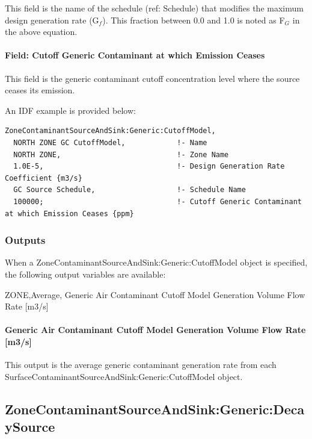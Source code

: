 This field is the name of the schedule (ref: Schedule) that modifies the maximum design generation rate (G\(_{f}\)). This fraction between 0.0 and 1.0 is noted as F\(_{G}\) in the above equation.

\paragraph{Field: Cutoff Generic Contaminant at which Emission Ceases}\label{field-cutoff-generic-contaminant-at-which-emission-ceases}

This field is the generic contaminant cutoff concentration level where the source ceases its emission.

An IDF example is provided below:

\begin{lstlisting}
ZoneContaminantSourceAndSink:Generic:CutoffModel,
  NORTH ZONE GC CutoffModel,            !- Name
  NORTH ZONE,                           !- Zone Name
  1.0E-5,                               !- Design Generation Rate Coefficient {m3/s}
  GC Source Schedule,                   !- Schedule Name
  100000;                               !- Cutoff Generic Contaminant at which Emission Ceases {ppm}
\end{lstlisting}

\subsubsection{Outputs}\label{outputs-9-003}

When a ZoneContaminantSourceAndSink:Generic:CutoffModel object is specified, the following output variables are available:

ZONE,Average, Generic Air Contaminant Cutoff Model Generation Volume Flow Rate {[}m3/s{]}

\paragraph{Generic Air Contaminant Cutoff Model Generation Volume Flow Rate {[}m3/s{]}}\label{generic-air-contaminant-cutoff-model-generation-volume-flow-rate-m3s}

This output is the average generic contaminant generation rate from each Surface\-Contaminant\-Source\-And\-Sink:\-Generic:\-Cutoff\-Model object.

\subsection{ZoneContaminantSourceAndSink:Generic:DecaySource}\label{zonecontaminantsourceandsinkgenericdecaysource}

